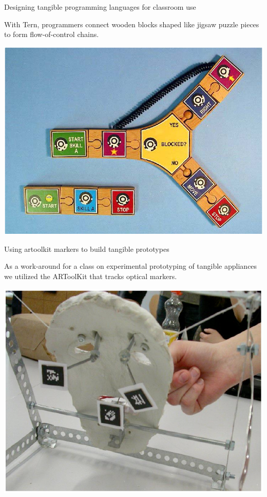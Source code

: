 \begin{frame} {Designing tangible programming languages for classroom use}
  
  With Tern, programmers connect wooden blocks shaped like jigsaw
  puzzle pieces to form flow-of-control chains.
  \medskip

  \includegraphics[scale=0.3]{img/tern.png}
\end{frame}

\begin{frame} {Using artoolkit markers to build tangible prototypes}
  
  As a work-around for a class on experimental prototyping of
  tangible appliances we utilized the ARToolKit that tracks
  optical markers.
  \medskip
  
  \includegraphics[scale=0.4]{img/artoolkit_prototyping.png}
\end{frame}


